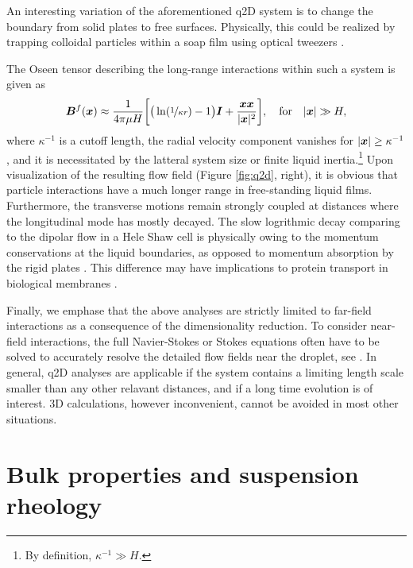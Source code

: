 \bigskip
An interesting variation of the aforementioned q2D system is to change the boundary from solid plates to free surfaces. Physically, this could be realized by trapping colloidal particles within a soap film using optical tweezers \citep{Leonardo_etal_2008}.

The Oseen tensor describing the long-range interactions within such a system is given as \citep{Leonardo_etal_2008, Diamant}
\begin{equation}
 \begin{aligned}
   {\bm B}^f({\bm x}) \approx \frac{1}{4\pi\mu H} \bigg[ \big( \ln(\nicefrac{1}{\kappa r}) -1 \big) {\bm I} +\frac{{\bm x}{\bm x} }{ \lvert{\bm x}\rvert^2} \bigg],
   \quad \textrm{for} \quad \lvert\bm x\rvert \gg H,
 \end{aligned}
\end{equation}
where $\kappa^{-1}$ is a cutoff length, \ie the radial velocity component vanishes for $\lvert\bm x\rvert \geq \kappa^{-1}$, and it is necessitated by the latteral system size or finite liquid inertia.\footnote{By definition, $\kappa^{-1} \gg H$.}
Upon visualization of the resulting flow field (Figure \ref{fig:q2d}, right), it is obvious that particle interactions have a much longer range in free-standing liquid films. Furthermore, the transverse motions remain strongly coupled at distances where the longitudinal mode has mostly decayed.
The slow logrithmic decay comparing to the dipolar flow in a Hele Shaw cell is physically owing to the momentum conservations at the liquid boundaries, as opposed to momentum absorption by the rigid plates \citep{Diamant}.
This difference may have implications to protein transport in biological membranes \citep{Saffman3111}.

\bigskip
Finally, we emphase that the above analyses are strictly limited to far-field interactions as a consequence of the dimensionality reduction.
To consider near-field interactions, the full Navier-Stokes or Stokes equations often have to be solved to accurately resolve the detailed flow fields near the droplet, see \eg \cite{zhu_gallaire_2016, flow-assist}. 
In general, q2D analyses are applicable if the system contains a limiting length scale smaller than any other relavant distances, and if a long time evolution is of interest.
3D calculations, however inconvenient, cannot be avoided in most other situations.


\section{Bulk properties and suspension rheology}
\label{sec:sus-rheo}

